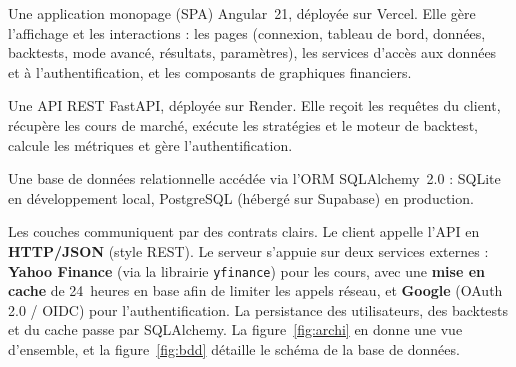 \documentclass[11pt,a4paper]{article}
\newcommand{\code}[1]{\texttt{#1}}
\begin{document}
\begin{description}[leftmargin=1.4em,style=nextline]
  \item[Couche présentation (client).] Une application monopage (SPA) Angular~21,
        déployée sur Vercel. Elle gère l'affichage et les interactions : les pages
        (connexion, tableau de bord, données, backtests, mode avancé, résultats,
        paramètres), les services d'accès aux données et à l'authentification, et
        les composants de graphiques financiers.
  \item[Couche application (serveur).] Une API REST FastAPI, déployée sur Render.
        Elle reçoit les requêtes du client, récupère les cours de marché, exécute
        les stratégies et le moteur de backtest, calcule les métriques et gère
        l'authentification.
  \item[Couche persistance (données).] Une base de données relationnelle accédée
        via l'ORM SQLAlchemy~2.0 : SQLite en développement local, PostgreSQL
        (hébergé sur Supabase) en production.
\end{description}

\noindent Les couches communiquent par des contrats clairs. Le client appelle
l'API en \textbf{HTTP/JSON} (style REST). Le serveur s'appuie sur deux services
externes : \textbf{Yahoo Finance} (via la librairie \code{yfinance}) pour les
cours, avec une \textbf{mise en cache} de 24~heures en base afin de limiter les
appels réseau, et \textbf{Google} (OAuth\,2.0 / OIDC) pour l'authentification. La
persistance des utilisateurs, des backtests et du cache passe par SQLAlchemy. La
figure~\ref{fig:archi} en donne une vue d'ensemble, et la figure~\ref{fig:bdd}
détaille le schéma de la base de données.
\end{document}
